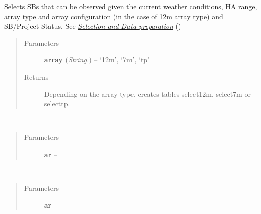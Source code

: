 \documentclass[a4paper,10pt,english]{sphinxmanual}
\begin{document}
\begin{fulllineitems}
\begin{fulllineitems}
\label{wtoapi:wtoAlgorithm.WtoAlgorithm.selector}
Selects SBs that can be observed given the current weather conditions,
HA range, array type and array configuration (in the case of 12m array
type) and SB/Project Status. See
{\hyperref[algorithm:selection]{\emph{Selection and Data preparation}}} ()
\begin{quote}\begin{description}
\item[{Parameters}] \leavevmode
\textbf{array} (\emph{String.}) -- `12m', `7m', `tp'

\item[{Returns}] \leavevmode
Depending on the array type, creates tables select12m, select7m
or selecttp.

\end{description}\end{quote}

\end{fulllineitems}


\begin{fulllineitems}
\label{wtoapi:wtoAlgorithm.WtoAlgorithm.set_array_ar}~\begin{quote}\begin{description}
\item[{Parameters}] \leavevmode
\textbf{ar} -- 

\end{description}\end{quote}

\end{fulllineitems}


\begin{fulllineitems}
\label{wtoapi:wtoAlgorithm.WtoAlgorithm.set_arrayar}~\begin{quote}\begin{description}
\item[{Parameters}] \leavevmode
\textbf{ar} -- 

\end{description}\end{quote}


\end{fulllineitems}
\end{fulllineitems}
\end{document}
